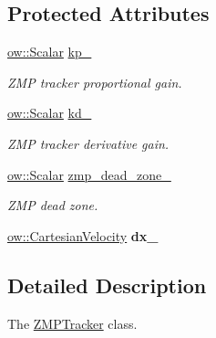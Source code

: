\subsection*{Protected Attributes}
\begin{DoxyCompactItemize}
\item 
\hyperlink{types_8h_ac412879ee4a239c8032aa2d647f4a74a}{ow\+::\+Scalar} \hyperlink{classow__balancer_1_1ZMPTracker_a2ad3c412fda1a90c99c8c2acd8112b1c}{kp\+\_\+}\hypertarget{classow__balancer_1_1ZMPTracker_a2ad3c412fda1a90c99c8c2acd8112b1c}{}\label{classow__balancer_1_1ZMPTracker_a2ad3c412fda1a90c99c8c2acd8112b1c}

\begin{DoxyCompactList}\small\item\em Z\+MP tracker proportional gain. \end{DoxyCompactList}\item 
\hyperlink{types_8h_ac412879ee4a239c8032aa2d647f4a74a}{ow\+::\+Scalar} \hyperlink{classow__balancer_1_1ZMPTracker_ab21240629d3fabc9ba6ce92e2031f4ce}{kd\+\_\+}\hypertarget{classow__balancer_1_1ZMPTracker_ab21240629d3fabc9ba6ce92e2031f4ce}{}\label{classow__balancer_1_1ZMPTracker_ab21240629d3fabc9ba6ce92e2031f4ce}

\begin{DoxyCompactList}\small\item\em Z\+MP tracker derivative gain. \end{DoxyCompactList}\item 
\hyperlink{types_8h_ac412879ee4a239c8032aa2d647f4a74a}{ow\+::\+Scalar} \hyperlink{classow__balancer_1_1ZMPTracker_ae00fcd527430ccf6ba22fad4055dee66}{zmp\+\_\+dead\+\_\+zone\+\_\+}\hypertarget{classow__balancer_1_1ZMPTracker_ae00fcd527430ccf6ba22fad4055dee66}{}\label{classow__balancer_1_1ZMPTracker_ae00fcd527430ccf6ba22fad4055dee66}

\begin{DoxyCompactList}\small\item\em Z\+MP dead zone. \end{DoxyCompactList}\item 
\hyperlink{classow__core_1_1CartesianVelocity}{ow\+::\+Cartesian\+Velocity} {\bfseries dx\+\_\+}\hypertarget{classow__balancer_1_1ZMPTracker_a6c65a0629ab76c2c09f194d03e27a2f5}{}\label{classow__balancer_1_1ZMPTracker_a6c65a0629ab76c2c09f194d03e27a2f5}

\end{DoxyCompactItemize}


\subsection{Detailed Description}
The \hyperlink{classow__balancer_1_1ZMPTracker}{Z\+M\+P\+Tracker} class. 

